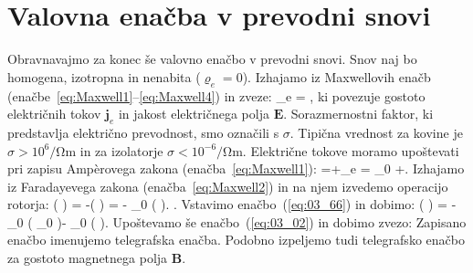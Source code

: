 \section{Valovna enačba v prevodni snovi}
Obravnavajmo za konec še valovno enačbo v prevodni snovi. Snov naj
bo homogena, izotropna in nenabita ($\varrho_e = 0$). Izhajamo
iz Maxwellovih enačb (enačbe~\ref{eq:Maxwell1}--\ref{eq:Maxwell4}) in zveze:
\beq
{}_e = \sigma {},
\label{eq:03_65}
\eeq
ki povezuje gostoto električnih tokov $\mathbf{j}_e $ in jakost 
električnega polja $\mathbf{E}$. Sorazmernostni faktor, ki predstavlja 
električno prevodnost, smo označili s $\sigma$. Tipična vrednost
za kovine je $\sigma > 10^6/\si{\ohm\m}$ in za izolatorje 
$\sigma < 10^{-6}/\si{\ohm\m}$. 
Električne tokove moramo upoštevati pri zapisu Amp\`{e}rovega zakona 
(enačba~\ref{eq:Maxwell1}):
\beq
\nabla\times{} =+_e = 
\varepsilon \varepsilon_0 +\sigma {}.
\label{eq:03_66}
\eeq
Izhajamo iz Faradayevega zakona (enačba~\ref{eq:Maxwell2}) in na njem izvedemo operacijo rotorja:
\beq
\nabla \times \left( \nabla \times  {}\right) = -\nabla\times \left(
\right) = - \mu \mu_0 
\left( \nabla \times {}\right).
\label{eq:03_67}
\eeq.
Vstavimo enačbo~(\ref{eq:03_66}) in dobimo:
\beq
\nabla \times \left( \nabla \times  {}\right) =
 -\mu \mu_0 
\left( \varepsilon \varepsilon_0 \right)-
\mu \mu_0 \left(\sigma {} \right).
\label{eq:03_671}
\eeq
Upoštevamo še enačbo~(\ref{eq:03_02}) in dobimo zvezo:
Zapisano enačbo imenujemo telegrafska enačba. Podobno izpeljemo tudi telegrafsko enačbo
za gostoto magnetnega polja $\mathbf{B}$.

